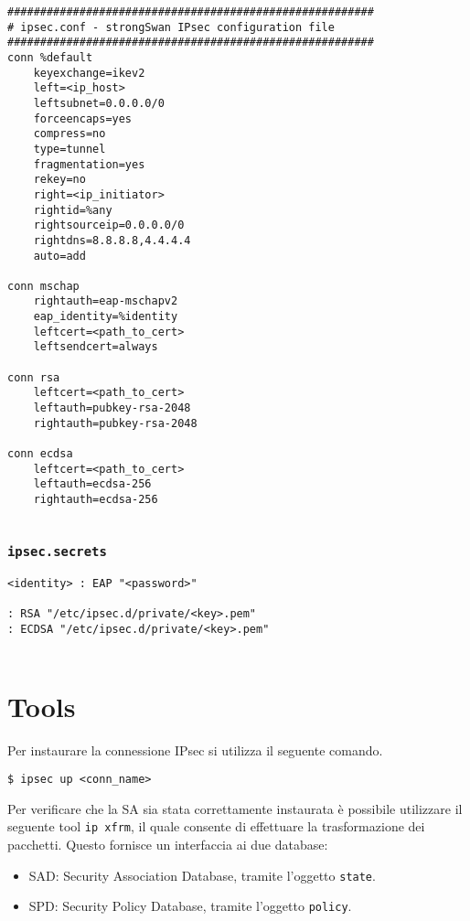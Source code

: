 \documentclass[
10pt, %
a4paper, %
oneside, %
headinclude,footinclude, %
BCOR5mm, %
]{scrartcl}
\begin{document}
\begin{lstlisting}
########################################################
# ipsec.conf - strongSwan IPsec configuration file
########################################################
conn %default
    keyexchange=ikev2
    left=<ip_host>
    leftsubnet=0.0.0.0/0
    forceencaps=yes
    compress=no
    type=tunnel
    fragmentation=yes
    rekey=no
    right=<ip_initiator>
    rightid=%any
    rightsourceip=0.0.0.0/0
    rightdns=8.8.8.8,4.4.4.4
    auto=add

conn mschap
    rightauth=eap-mschapv2
    eap_identity=%identity
    leftcert=<path_to_cert>
    leftsendcert=always

conn rsa
    leftcert=<path_to_cert>
    leftauth=pubkey-rsa-2048
    rightauth=pubkey-rsa-2048
    
conn ecdsa
    leftcert=<path_to_cert>
    leftauth=ecdsa-256
    rightauth=ecdsa-256
    
\end{lstlisting}

\subsubsection*{\lstinline|ipsec.secrets|}

\begin{lstlisting}
<identity> : EAP "<password>"

: RSA "/etc/ipsec.d/private/<key>.pem"
: ECDSA "/etc/ipsec.d/private/<key>.pem"


\end{lstlisting}

\section{Tools}

Per instaurare la connessione IPsec si utilizza il seguente comando.
\vspace*{0.2cm}
\begin{lstlisting}
$ ipsec up <conn_name>
\end{lstlisting}
Per verificare che la SA sia stata correttamente instaurata è possibile utilizzare il seguente tool \lstinline|ip xfrm|,
il quale consente di effettuare la trasformazione dei pacchetti. Questo fornisce un interfaccia ai due database:
\begin{itemize}
    \item SAD: Security Association Database, tramite l'oggetto \lstinline|state|.
    \item SPD: Security Policy Database, tramite l'oggetto \lstinline|policy|.
\end{itemize}
\end{document}
